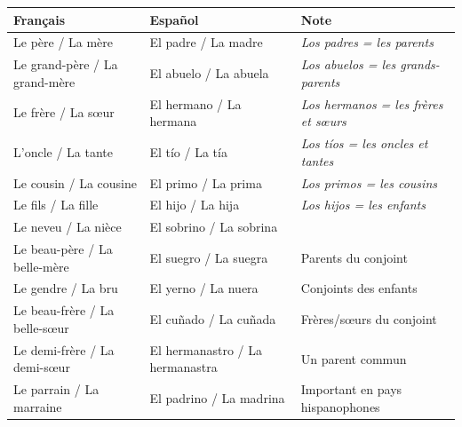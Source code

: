 \documentclass[11pt]{article}
\newcommand{\esp}[1]{\ifmmode\text{\textit{#1}}\else\begingroup\selectlanguage{spanish}\itshape #1\endgroup\fi}
\begin{document}
\begin{definition}
\begin{center}
\begin{tabularx}{\linewidth}{|X|X|X|}
\hline
\rowcolor{popblueL} Français & Español & Note \\
\hline
Le père / La mère & El padre / La madre & \esp{Los padres} = les parents \\
\hline
Le grand-père / La grand-mère & El abuelo / La abuela & \esp{Los abuelos} = les grands-parents \\
\hline
Le frère / La sœur & El hermano / La hermana & \esp{Los hermanos} = les frères et sœurs \\
\hline
L'oncle / La tante & El tío / La tía & \esp{Los tíos} = les oncles et tantes \\
\hline
Le cousin / La cousine & El primo / La prima & \esp{Los primos} = les cousins \\
\hline
Le fils / La fille & El hijo / La hija & \esp{Los hijos} = les enfants \\
\hline
Le neveu / La nièce & El sobrino / La sobrina & \\
\hline
Le beau-père / La belle-mère & El suegro / La suegra & Parents du conjoint \\
\hline
Le gendre / La bru & El yerno / La nuera & Conjoints des enfants \\
\hline
Le beau-frère / La belle-sœur & El cuñado / La cuñada & Frères/sœurs du conjoint \\
\hline
Le demi-frère / La demi-sœur & El hermanastro / La hermanastra & Un parent commun \\
\hline
Le parrain / La marraine & El padrino / La madrina & Important en pays hispanophones \\
\hline
\end{tabularx}
\end{center}
\end{definition}
\end{document}
